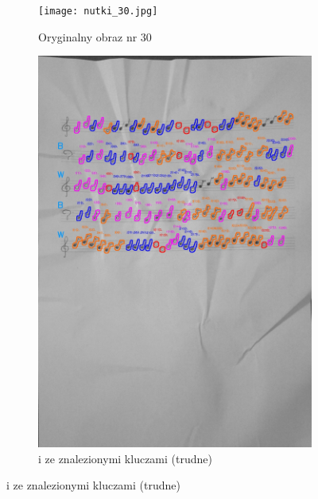 \documentclass[11pt]{article}
\begin{document}
\begin{figure}
\begin{subfigure}[b]{0.475\textwidth}
        \texttt{[image: nutki\_30.jpg]}
        \caption[]%
        {{\small Oryginalny obraz nr 30}}
        \label{fig:sub3}
    \end{subfigure}
    \quad
    \begin{subfigure}[b]{0.475\textwidth}
        \centering
        \graphicspath{ {keys/} }
        \includegraphics[width=\textwidth]{image_30.jpg}
        \caption[]%
        {{\small i ze znalezionymi kluczami (trudne)}}
        \label{fig:sub 4}
    \end{subfigure}
    \label{fig 1}
\end{figure}

\FloatBarrier

\end{document}
